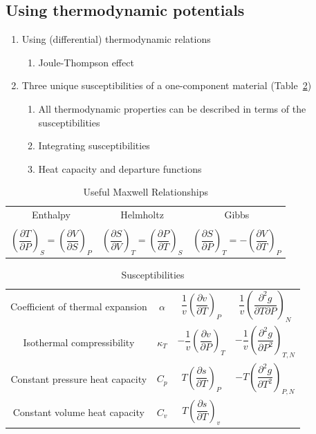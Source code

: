\documentclass[11pt]{article}
\begin{document}
\subsection{Using thermodynamic potentials}
\label{sec:org9119ad9}
\begin{enumerate}
\item Using (differential) thermodynamic relations
\begin{enumerate}
\item Joule-Thompson effect
\end{enumerate}
\item Three unique susceptibilities of a one-component material (Table~\ref{susceptibilities})
\begin{enumerate}
\item All thermodynamic properties can be described in terms of the susceptibilities
\item Integrating susceptibilities
\item Heat capacity and departure functions
\end{enumerate}
\end{enumerate}
\begin{table}
  \begin{center}
  \caption{\label{Maxwell}Useful Maxwell Relationships}
  \begin{tabular}{ccc}
\hline
Enthalpy   & Helmholtz & Gibbs \\
 & & \\
$ \left ( \dfrac{\partial T}{\partial P}\right )_S =  \left ( \dfrac{\partial V}{\partial
    S}\right )_P  $ &
$ \left ( \dfrac{\partial S}{\partial V}\right )_T =  \left ( \dfrac{\partial P}{\partial
    T}\right )_S  $ &
$ \left ( \dfrac{\partial S}{\partial P}\right )_T =  -\left ( \dfrac{\partial V}{\partial
    T}\right )_P  $ \\
\hline
  \end{tabular}
  \end{center}
\end{table}
\begin{table}
  \begin{center}
  \caption{\label{susceptibilities}Susceptibilities}
  \begin{tabular}{cccc}
\hline
    Coefficient of thermal expansion & $\alpha$ &  $\dfrac{1}{v} \left (
      \dfrac{\partial v}{\partial T} \right )_P$  & $\dfrac{1}{v} \left (
      \dfrac{\partial^2 g}{\partial T \partial P} \right )_N$\\
  Isothermal compressibility   & $\kappa_T$  & $-\dfrac{1}{v} \left (
      \dfrac{\partial v}{\partial P} \right )_T$ & $-\dfrac{1}{v} \left (
      \dfrac{\partial^2 g}{\partial P^2} \right )_{T,N}$\\
  Constant  pressure heat capacity & $C_p$ & $ T \left ( \dfrac{\partial
      s}{\partial T}\right )_P $ & $-T \left (
      \dfrac{\partial^2 g}{\partial T^2} \right )_{P,N}$\\
  Constant  volume heat capacity & $C_v$ & $ T \left ( \dfrac{\partial
      s}{\partial T}\right )_v $ & \\
\hline
  \end{tabular}
  \end{center}
\end{table}
\end{document}
